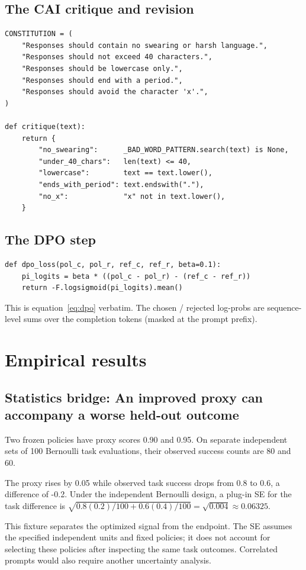 \documentclass[11pt,oneside]{scrbook}
\begin{document}
\section{The CAI critique and revision}

\begin{verbatim}
CONSTITUTION = (
    "Responses should contain no swearing or harsh language.",
    "Responses should not exceed 40 characters.",
    "Responses should be lowercase only.",
    "Responses should end with a period.",
    "Responses should avoid the character 'x'.",
)

def critique(text):
    return {
        "no_swearing":      _BAD_WORD_PATTERN.search(text) is None,
        "under_40_chars":   len(text) <= 40,
        "lowercase":        text == text.lower(),
        "ends_with_period": text.endswith("."),
        "no_x":             "x" not in text.lower(),
    }
\end{verbatim}

\section{The DPO step}

\begin{verbatim}
def dpo_loss(pol_c, pol_r, ref_c, ref_r, beta=0.1):
    pi_logits = beta * ((pol_c - pol_r) - (ref_c - ref_r))
    return -F.logsigmoid(pi_logits).mean()
\end{verbatim}

This is equation~\eqref{eq:dpo} verbatim. The chosen / rejected log-probs
are sequence-level sums over the completion tokens (masked at the prompt
prefix).

\chapter{Empirical results}

\section{Statistics bridge: An improved proxy can accompany a worse held-out outcome}
\begin{example}
Two frozen policies have proxy scores 0.90 and 0.95. On separate independent sets of 100 Bernoulli task evaluations, their observed success counts are 80 and 60.

The proxy rises by 0.05 while observed task success drops from 0.8 to 0.6, a difference of -0.2. Under the independent Bernoulli design, a plug-in SE for the task difference is $\sqrt{0.8(0.2)/100+0.6(0.4)/100}=\sqrt{0.004}\approx0.06325$.
\end{example}
This fixture separates the optimized signal from the endpoint. The SE assumes the specified independent units and fixed policies; it does not account for selecting these policies after inspecting the same task outcomes. Correlated prompts would also require another uncertainty analysis.
\end{document}
